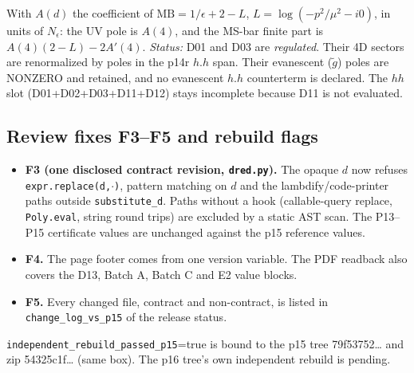 

With $A(d)$ the coefficient of $\mathrm{MB}=1/\epsilon+2-L$, $L=\log(-p^2/\mu^2-i0)$, in units of $N_\epsilon$:
the UV pole is $A(4)$, and the MS-bar finite part is $A(4)(2-L)-2A'(4)$. \emph{Status:} D01 and D03 are
\emph{regulated}. Their 4D sectors are renormalized by poles in the p14r $h.h$ span. Their evanescent ($\tilde g$)
poles are NONZERO and retained, and no evanescent $h.h$ counterterm is declared. The $hh$ slot (D01+D02+D03+D11+D12)
stays incomplete because D11 is not evaluated.

\subsection{Review fixes F3--F5 and rebuild flags}
\begin{itemize}
\item \textbf{F3 (one disclosed contract revision, \texttt{dred.py}).} The opaque $d$ now refuses
\texttt{expr.replace(d,$\cdot$)}, pattern matching on $d$ and the lambdify/code-printer paths outside
\texttt{substitute\_d}. Paths without a hook (callable-query replace, \texttt{Poly.eval}, string round trips) are
excluded by a static AST scan. The P13--P15 certificate values are unchanged against the p15 reference values.
\item \textbf{F4.} The page footer comes from one version variable. The PDF readback also covers the D13, Batch A,
Batch C and E2 value blocks.
\item \textbf{F5.} Every changed file, contract and non-contract, is listed in \texttt{change\_log\_vs\_p15} of the
release status.
\end{itemize}
\texttt{independent\_rebuild\_passed\_p15}=true is bound to the p15 tree 79f53752\ldots{} and zip 54325c1f\ldots{} (same
box). The p16 tree's own independent rebuild is pending.
